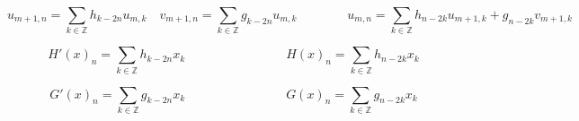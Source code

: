 \[  
	u_{m+1,n} = \sum_{k \in  \mathbb{Z}} h_{k-2n} u_{m,k} \quad v_{m+1,n} = \sum_{k \in  \mathbb{Z}} g_{k-2n} u_{m,k}
	\qquad \qquad
	u_{m,n} = \sum_{k \in  \mathbb{Z}} h_{n-2k} u_{m+1,k} + g_{n-2k} v_{m+1,k}
\]

\[
	H'(x)_n = \sum_{k \in  \mathbb{Z}} h_{k-2n} x_k
	\qquad \qquad \qquad \qquad
	H(x)_n = \sum_{k \in  \mathbb{Z}} h_{n-2k} x_k
\]

\[
	G'(x)_n = \sum_{k \in  \mathbb{Z}} g_{k-2n} x_k
	\qquad \qquad \qquad \qquad
	G(x)_n = \sum_{k \in  \mathbb{Z}} g_{n-2k} x_k
\]
